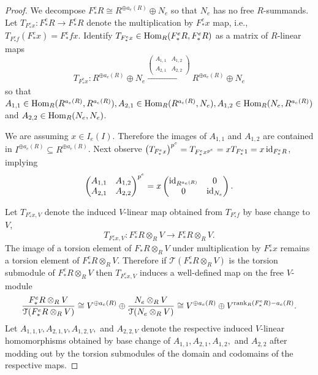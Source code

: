 \documentclass[12pt]{amsart}
\numberwithin{equation}{theorem}
\theoremstyle{plain}
\begin{document}
\begin{proof}
    We decompose $F^e_*R\cong R^{\oplus a_e(R)}\oplus N_e$ so that $N_e$ has no free $R$-summands. Let $T_{F^e_*x}:F^e_*R\to F^e_*R$ denote the multiplication by $F^e_*x$ map, i.e., $T_{F^e_*f}(F^e_*x) = F^e_*fx$. Identify $T_{F^e_*x}\in \operatorname{Hom}_R(F^e_*R,F^e_*R)$ as a matrix of $R$-linear maps
    \[
    T_{F^e_*x}: R^{\oplus a_e(R)} \oplus N_e \xrightarrow{\begin{pmatrix}A_{1,1} & A_{1,2} \\ {A_{2,1}} & A_{2,2}\end{pmatrix}} R^{\oplus a_e(R)} \oplus N_e
    \]
    so that $A_{1,1}\in \operatorname{Hom}_R(R^{a_e(R)}, R^{a_e(R)}), A_{2,1}\in \operatorname{Hom}_R(R^{a_e(R)}, N_e), A_{1,2}\in \operatorname{Hom}_R(N_e, R^{a_e(R)})$ and $A_{2,2}\in \operatorname{Hom}_R(N_e, N_e)$. 

    We are assuming $x\in I_e(I)$. Therefore the images of $A_{1,1}$ and $A_{1,2}$ are contained in $I^{\oplus a_e(R)}\subseteq R^{\oplus a_e(R)}$. Next observe $\left(T_{F^e_*x}\right)^{p^e} = T_{F^e_*x^{p^e}} = xT_{F^e_*1} = x\operatorname{{id}}_{F^e_*R}$, implying
    \[
    \begin{pmatrix}A_{1,1} & A_{1,2} \\ {A_{2,1}} & A_{2,2}\end{pmatrix}^{p^e} = x\begin{pmatrix}\operatorname{{id}}_{R^{a_e(R)}} & 0\\ 0 & \operatorname{{id}}_{N_e}\end{pmatrix}.
    \]

    Let $T_{F^e_*x,V}$ denote the induced $V$-linear map obtained from $T_{F^e_*f}$ by base change to $V$,
    \[
    T_{F^e_*x,V}: F^e_*R\otimes_R V\to F^e_*R\otimes_R V.
    \]
    The image of a torsion element of $F_*R\otimes_R V$ under multiplication by $F^e_*x$ remains a torsion element of $F^e_*R\otimes_R V$. Therefore if $\mathcal{T}(F^e_*R\otimes_R V)$ is the torsion submodule of $F^e_*R\otimes_RV$ then $T_{F^e_*x,V}$ induces a well-defined map on the free $V$-module 
    \[
    \frac{F^e_*R\otimes_R V}{\mathcal{T}(F^e_*R\otimes_R V)}\cong V^{\oplus a_e(R)}\oplus \frac{N_e\otimes_RV}{\mathcal{T}(N_e\otimes_RV)}\cong V^{\oplus a_e(R)}\oplus V^{\operatorname{{rank}}_R(F^e_*R)-a_e(R)}.
    \]
    Let $A_{1,1,V},A_{2,1,V},A_{1,2,V},$ and $A_{2,2,V}$ denote the respective induced $V$-linear homomorphisms obtained by base change of $A_{1,1},A_{2,1}, A_{1,2},$ and $A_{2,2}$ after modding out by the torsion submodules of the domain and codomains of the respective maps.


\end{proof}
\end{document}
